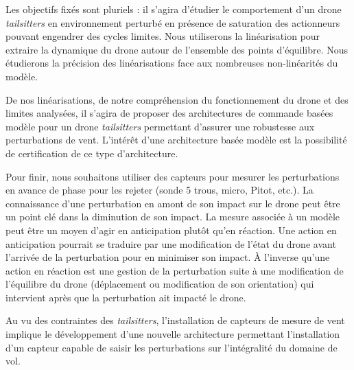 Les objectifs fixés sont pluriels : il s'agira d'étudier le comportement d'un drone \textit{tailsitters} en environnement perturbé en présence de saturation des actionneurs pouvant engendrer des cycles limites. Nous utiliserons la linéarisation pour extraire la dynamique du drone autour de l'ensemble des points d'équilibre. Nous étudierons la précision des linéarisations face aux nombreuses non-linéarités du modèle. 

De nos linéarisations, de notre compréhension du fonctionnement du drone et des limites analysées, il s'agira de proposer des architectures de commande basées modèle pour un drone \textit{tailsitters} permettant d'assurer une robustesse aux perturbations de vent. L'intérêt d'une architecture basée modèle est la possibilité de certification de ce type d'architecture. 

Pour finir, nous souhaitons utiliser des capteurs pour mesurer les perturbations en avance de phase pour les rejeter (sonde 5 trous, micro, Pitot, etc.). La connaissance d'une perturbation en amont de son impact sur le drone peut être un point clé dans la diminution de son impact. La mesure associée à un modèle peut être un moyen d'agir en anticipation plutôt qu'en réaction. Une action en anticipation pourrait se traduire par une modification de l'état du drone avant l'arrivée de la perturbation pour en minimiser son impact. À l'inverse qu'une action en réaction est une gestion de la perturbation suite à une modification de l'équilibre du drone (déplacement ou modification de son orientation) qui intervient après que la perturbation ait impacté le drone.  

Au vu des contraintes des \textit{tailsitters}, l'installation de capteurs de mesure de vent implique le développement d'une nouvelle architecture permettant l'installation d'un capteur capable de saisir les perturbations sur l'intégralité du domaine de vol.

